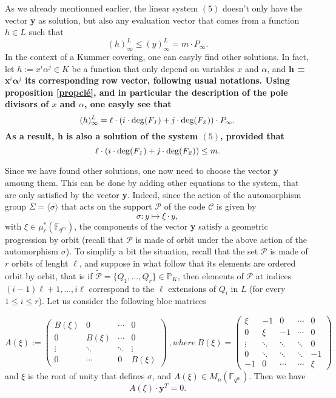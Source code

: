 \documentclass[10pt]{article}
\newcommand{\s}{\vspace{0.3cm}}
\newcommand{\cd}{\cdot}
\newcommand{\fqm}{\mathbb{F}_{q^m}}
\newcommand{\PR}{\mathcal{P}}
\begin{document}
\s

As we already mentionned earlier, the linear system $(5)$ doesn't only have the vector \textbf{y} as solution, but also any evaluation vector that comes from a function $h \in L$ such that 
\[(h)^L_{\infty} \leq (y)^L_{\infty} = m \cd P_{\infty}.\]
In the context of a Kummer covering, one can easyly find other solutions. In fact, let $h := x^i\alpha^j \in K$ be a function that only depend on variables $x$ and $\alpha$, and \bf{h} \rm = \textbf{x}$^i\boldsymbol{\alpha}^j$ \rm its corresponding row vector, following usual notations. Using proposition \ref{propclé}, and in particular the description of the pole divisors of $x$ and $\alpha$, one easyly see that 
\[ (h)^L_{\infty} = \ell \cd \left(i \cd \rm{deg}\it(F_1)+j \cd \rm{deg}\it(F_2)\right) \cd P_{\infty}.\]
As a result, \bf{h} \rm is also a solution of the system $(5)$, provided that
\[\ell \cd \left(i \cd \rm{deg}\it(F_1)+j \cd \rm{deg}\it(F_2)\right) \leq m.\]


\s

Since we have found other solutions, one now need to choose the vector \textbf{y} amoung them. This can be done by adding other equations to the system, that are only satisfied by the vector \textbf{y}. Indeed, since the action of the automorphism group $\Sigma = \langle\sigma\rangle$ that acts on the support $\PR$ of the code $\mathcal{C}$ is given by 
\[\sigma : y \longmapsto \xi \cd y,\]
with $\xi \in \mu^*_{\ell}(\fqm)$, the components of the vector \textbf{y} satisfy a geometric progression by orbit (recall that $\PR$ is made of orbit under the above action of the automorphism $\sigma$). To simplify a bit the situation, recall that the set $\PR$ is made of $r$ orbits of lenght $\ell$, and suppose in what follow that its elements are ordered orbit by orbit, that is if $\tilde{\PR} = \{Q_1,...,Q_r\} \in \mathbb{P}_K$, then elements of $\PR$ at indices $(i-1)\ell+1,...,i\ell$ correspond to the $\ell$ extensions of $Q_{i}$ in $L$ (for every $1\leq i \leq r$). Let us consider the following bloc matrices

\begin{equation*}
A(\xi) := 
\begin{pmatrix}
B(\xi) & 0 & \cdots & 0 \\
0 & B(\xi) & \cdots & 0 \\
\vdots & \ddots & \ddots & \vdots \\
0 & \cdots & 0 & B(\xi)
\end{pmatrix} \ , where \ 
B(\xi) = 
\begin{pmatrix}
\xi & -1 & 0 & \cdots & 0 \\
0 & \xi & -1 & \cdots & 0 \\
\vdots & \ddots & \ddots & \ddots & 0 \\
0 & \ddots & \ddots & \ddots & -1 \\
-1 & 0 & \cdots & \cdots & \xi
\end{pmatrix}
\end{equation*}
and $\xi$ is the root of unity that defines $\sigma$, and $A(\xi) \in M_{n}(\fqm)$. Then we have
\begin{equation*}
A(\xi) \cd \textbf{y}^T
= 0.
\end{equation*}
\end{document}
